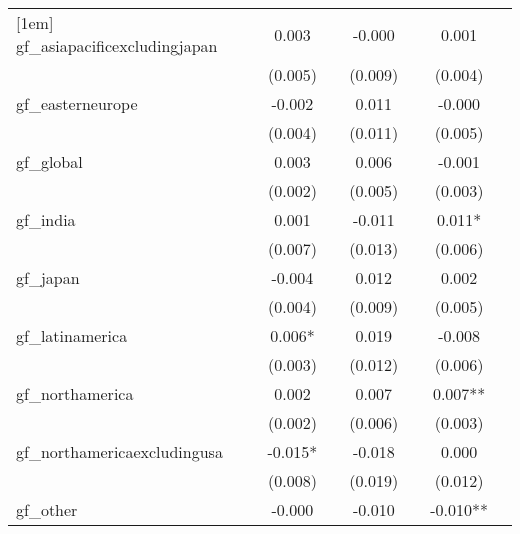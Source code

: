 {\begin{tabular}{l*{6}{c}}
[1em]
gf\_asiapacificexcludingjapan&       0.003   &               &      -0.000   &               &       0.001   &               \\
            &     (0.005)   &               &     (0.009)   &               &     (0.004)   &               \\
[1em]
gf\_easterneurope&      -0.002   &               &       0.011   &               &      -0.000   &               \\
            &     (0.004)   &               &     (0.011)   &               &     (0.005)   &               \\
[1em]
gf\_global   &       0.003   &               &       0.006   &               &      -0.001   &               \\
            &     (0.002)   &               &     (0.005)   &               &     (0.003)   &               \\
[1em]
gf\_india    &       0.001   &               &      -0.011   &               &       0.011*  &               \\
            &     (0.007)   &               &     (0.013)   &               &     (0.006)   &               \\
[1em]
gf\_japan    &      -0.004   &               &       0.012   &               &       0.002   &               \\
            &     (0.004)   &               &     (0.009)   &               &     (0.005)   &               \\
[1em]
gf\_latinamerica&       0.006*  &               &       0.019   &               &      -0.008   &               \\
            &     (0.003)   &               &     (0.012)   &               &     (0.006)   &               \\
[1em]
gf\_northamerica&       0.002   &               &       0.007   &               &       0.007** &               \\
            &     (0.002)   &               &     (0.006)   &               &     (0.003)   &               \\
[1em]
gf\_northamericaexcludingusa&      -0.015*  &               &      -0.018   &               &       0.000   &               \\
            &     (0.008)   &               &     (0.019)   &               &     (0.012)   &               \\
[1em]
gf\_other    &      -0.000   &               &      -0.010   &               &      -0.010** &               \\

\end{tabular}}
